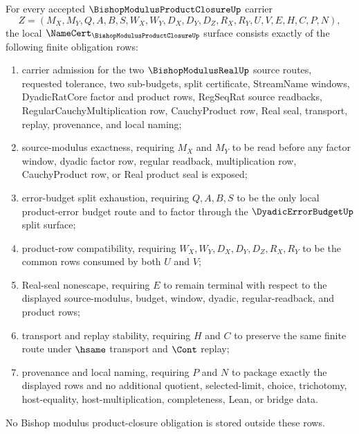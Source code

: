 \begin{theorem}
\label{thm:bishop-modulus-product-closure-namecert-obligations}
For every accepted $\BishopModulusProductClosureUp$ carrier
$$
Z=(M_X,M_Y,Q,A,B,S,W_X,W_Y,D_X,D_Y,D_Z,R_X,R_Y,U,V,E,H,C,P,N),
$$
the local $\NameCert_{\BishopModulusProductClosureUp}$ surface consists exactly of the following finite obligation rows:
\begin{enumerate}
\item carrier admission for the two $\BishopModulusRealUp$ source routes, requested tolerance, two sub-budgets, split certificate, StreamName windows, DyadicRatCore factor and product rows, RegSeqRat source readbacks, RegularCauchyMultiplication row, CauchyProduct row, Real seal, transport, replay, provenance, and local naming;
\item source-modulus exactness, requiring $M_X$ and $M_Y$ to be read before any factor window, dyadic factor row, regular readback, multiplication row, CauchyProduct row, or Real product seal is exposed;
\item error-budget split exhaustion, requiring $Q,A,B,S$ to be the only local product-error budget route and to factor through the $\DyadicErrorBudgetUp$ split surface;
\item product-row compatibility, requiring $W_X,W_Y,D_X,D_Y,D_Z,R_X,R_Y$ to be the common rows consumed by both $U$ and $V$;
\item Real-seal nonescape, requiring $E$ to remain terminal with respect to the displayed source-modulus, budget, window, dyadic, regular-readback, and product rows;
\item transport and replay stability, requiring $H$ and $C$ to preserve the same finite route under $\hsame$ transport and $\Cont$ replay;
\item provenance and local naming, requiring $P$ and $N$ to package exactly the displayed rows and no additional quotient, selected-limit, choice, trichotomy, host-equality, host-multiplication, completeness, Lean, or bridge data.
\end{enumerate}
No Bishop modulus product-closure obligation is stored outside these rows.
\end{theorem}
